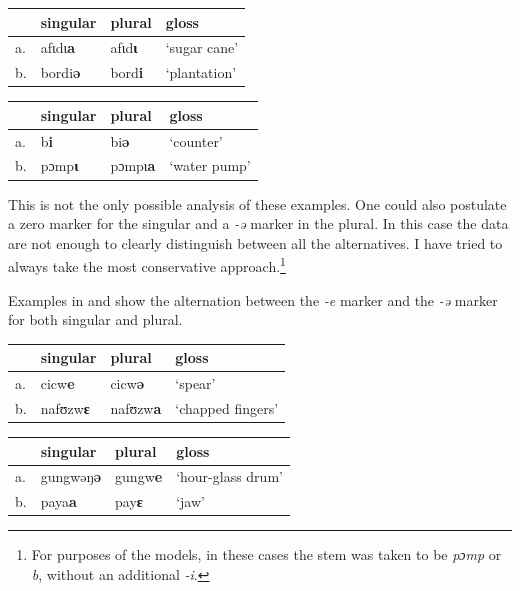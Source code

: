\begin{exe}
    \ex \label{ipl-kasem}
    \begin{tabular}[t]{llll}
      & singular        & plural         & gloss        \\
      \midrule
      a. & afɩdɩ\textbf{a} & afɩd\textbf{ɩ} & `sugar cane' \\
      b. & bordi\textbf{ə} & bord\textbf{i} & `plantation' \\
    \end{tabular}
\end{exe}

\begin{exe}
    \ex\label{isg-kasem}
    \begin{tabular}[t]{llll}
      & singular       & plural          & gloss        \\
      \midrule
      a. & b\textbf{i}    & bi\textbf{ə}    & `counter'    \\
      b. & pɔmp\textbf{ɩ} & pɔmpɩ\textbf{a} & `water pump' \\
    \end{tabular}
\end{exe}

This is not the only possible analysis of these examples. One could also postulate a zero marker for the singular and a \textit{-ə} marker in the plural. In this case the data are not enough to clearly distinguish between all the alternatives. I have tried to always take the most conservative approach.\footnote{For purposes of the models, in these cases the stem was taken to be \textit{pɔmp} or \textit{b}, without an additional \textit{-i}.}

Examples in  and  show the alternation between the \textit{-e} marker and the \textit{-ə} marker for both singular and plural.

\begin{exe}
    \ex \label{esg-kasem}
    \begin{tabular}[t]{llll}
      & singular & plural  & gloss             \\
      \midrule
      a. & cicw\textbf{e}    & cicw\textbf{ə}   & `spear'           \\
      b. & nafʊzw\textbf{ɛ}  & nafʊzw\textbf{a} & `chapped fingers' \\
    \end{tabular}
\end{exe}

\begin{exe}
    \ex \label{epl-kasem}
    \begin{tabular}[t]{llll}
      & singular & plural & gloss             \\
      \midrule
      a. & gungwəŋ\textbf{ə} & gungw\textbf{e} & `hour-glass drum' \\
      b. & paya\textbf{a}    & pay\textbf{ɛ}   & `jaw'             \\
    \end{tabular}
\end{exe}

